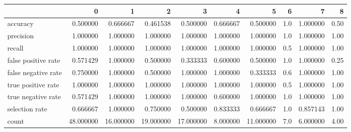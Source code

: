 \begin{tabular}{lrrrrrrrrr}
\toprule
{} &          0 &          1 &          2 &          3 &         4 &          5 &    6 &         7 &     8 \\
\midrule
accuracy            &   0.500000 &   0.666667 &   0.461538 &   0.500000 &  0.666667 &   0.500000 &  1.0 &  1.000000 &  0.50 \\
precision           &   1.000000 &   1.000000 &   1.000000 &   1.000000 &  1.000000 &   1.000000 &  1.0 &  1.000000 &  1.00 \\
recall              &   1.000000 &   1.000000 &   1.000000 &   1.000000 &  1.000000 &   1.000000 &  0.5 &  1.000000 &  1.00 \\
false positive rate &   0.571429 &   1.000000 &   0.500000 &   0.333333 &  0.600000 &   0.500000 &  1.0 &  1.000000 &  0.25 \\
false negative rate &   0.750000 &   1.000000 &   0.500000 &   1.000000 &  1.000000 &   0.333333 &  0.6 &  1.000000 &  1.00 \\
true positive rate  &   1.000000 &   1.000000 &   1.000000 &   1.000000 &  1.000000 &   1.000000 &  0.5 &  1.000000 &  1.00 \\
true negative rate  &   0.571429 &   1.000000 &   1.000000 &   1.000000 &  0.600000 &   1.000000 &  1.0 &  1.000000 &  1.00 \\
selection rate      &   0.666667 &   1.000000 &   0.750000 &   0.500000 &  0.833333 &   0.666667 &  1.0 &  0.857143 &  1.00 \\
count               &  48.000000 &  16.000000 &  19.000000 &  17.000000 &  8.000000 &  11.000000 &  7.0 &  6.000000 &  4.00 \\
\bottomrule
\end{tabular}
